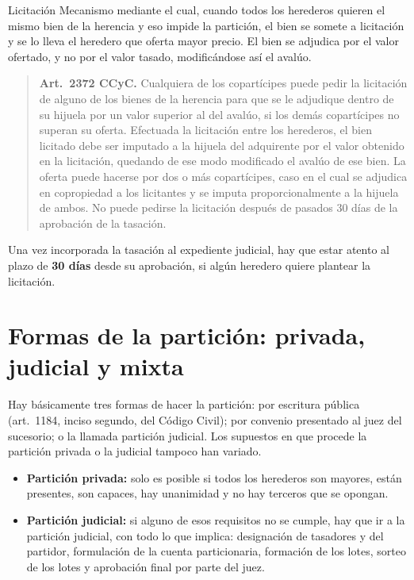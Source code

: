 \documentclass[12pt,oneside]{book}
\begin{document}
\begin{definition}{Licitación}
Mecanismo mediante el cual, cuando todos los herederos quieren el mismo bien de la herencia y eso impide la partición, el bien se somete a licitación y se lo lleva el heredero que oferta mayor precio. El bien se adjudica por el valor ofertado, y no por el valor tasado, modificándose así el avalúo.
\end{definition}

\begin{quote}
\textbf{Art.~2372 CCyC.} Cualquiera de los copartícipes puede pedir la licitación de alguno de los bienes de la herencia para que se le adjudique dentro de su hijuela por un valor superior al del avalúo, si los demás copartícipes no superan su oferta. Efectuada la licitación entre los herederos, el bien licitado debe ser imputado a la hijuela del adquirente por el valor obtenido en la licitación, quedando de ese modo modificado el avalúo de ese bien. La oferta puede hacerse por dos o más copartícipes, caso en el cual se adjudica en copropiedad a los licitantes y se imputa proporcionalmente a la hijuela de ambos. No puede pedirse la licitación después de pasados 30 días de la aprobación de la tasación.
\end{quote}

\begin{important}
Una vez incorporada la tasación al expediente judicial, hay que estar atento al plazo de \textbf{30 días} desde su aprobación, si algún heredero quiere plantear la licitación.
\end{important}

\section{Formas de la partición: privada, judicial y mixta}

Hay básicamente tres formas de hacer la partición: por escritura pública (art.~1184, inciso segundo, del Código Civil); por convenio presentado al juez del sucesorio; o la llamada partición judicial. Los supuestos en que procede la partición privada o la judicial tampoco han variado.

\begin{itemize}
    \item \textbf{Partición privada:} solo es posible si todos los herederos son mayores, están presentes, son capaces, hay unanimidad y no hay terceros que se opongan.
    \item \textbf{Partición judicial:} si alguno de esos requisitos no se cumple, hay que ir a la partición judicial, con todo lo que implica: designación de tasadores y del partidor, formulación de la cuenta particionaria, formación de los lotes, sorteo de los lotes y aprobación final por parte del juez.
\end{itemize}
\end{document}
